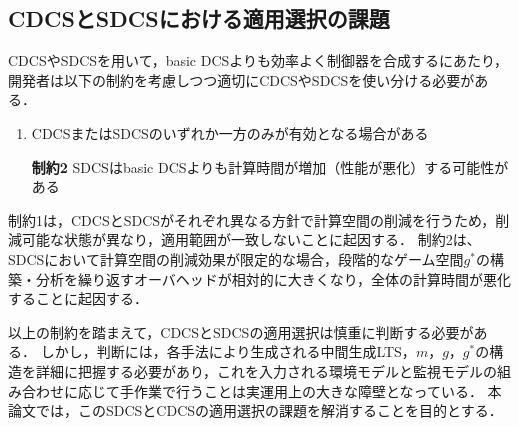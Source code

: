 
\subsection{CDCSとSDCSにおける適用選択の課題}
\label{subsection:limitation}
CDCSやSDCSを用いて，basic DCSよりも効率よく制御器を合成するにあたり，開発者は以下の制約を考慮しつつ適切にCDCSやSDCSを使い分ける必要がある\cite{yamauchi:IPSJ2024}．

\begin{enumerate}[\bf 制約1]
\item CDCSまたはSDCSのいずれか一方のみが有効となる場合がある
\item[\bf 制約2]  SDCSはbasic DCSよりも計算時間が増加（性能が悪化）する可能性がある
\end{enumerate}

制約1は，CDCSとSDCSがそれぞれ異なる方針で計算空間の削減を行うため，削減可能な状態が異なり，適用範囲が一致しないことに起因する．
制約2は、SDCSにおいて計算空間の削減効果が限定的な場合，段階的なゲーム空間$g^{*}$の構築・分析を繰り返すオーバヘッドが相対的に大きくなり，全体の計算時間が悪化することに起因する．

以上の制約を踏まえて，CDCSとSDCSの適用選択は慎重に判断する必要がある．
しかし，判断には，各手法により生成される中間生成LTS，$m$，$g$，$g^{*}$の構造を詳細に把握する必要があり，これを入力される環境モデルと監視モデルの組み合わせに応じて手作業で行うことは実運用上の大きな障壁となっている．
本論文では，このSDCSとCDCSの適用選択の課題を解消することを目的とする．

